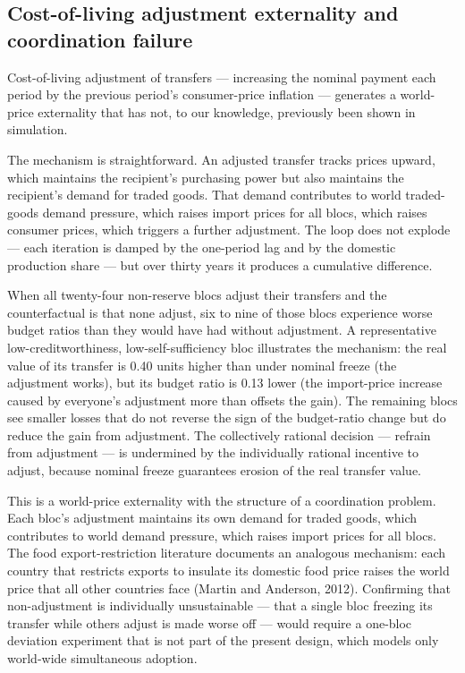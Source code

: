 \documentclass[preprint,review,12pt]{elsarticle}
\begin{document}
\subsection{Cost-of-living adjustment externality and coordination failure}

Cost-of-living adjustment of transfers --- increasing the nominal
payment each period by the previous period's consumer-price inflation
--- generates a world-price externality that has not, to our knowledge,
previously been shown in simulation.

The mechanism is straightforward. An adjusted transfer tracks prices
upward, which maintains the recipient's purchasing power but also
maintains the recipient's demand for traded goods. That demand
contributes to world traded-goods demand pressure, which raises import
prices for all blocs, which raises consumer prices, which triggers a
further adjustment. The loop does not explode --- each iteration is
damped by the one-period lag and by the domestic production share ---
but over thirty years it produces a cumulative difference.

When all twenty-four non-reserve blocs adjust their transfers and the
counterfactual is that none adjust, six to nine of those blocs
experience worse budget ratios than they would have had without
adjustment. A representative low-creditworthiness, low-self-sufficiency
bloc illustrates the mechanism: the real value of its transfer is 0.40
units higher than under nominal freeze (the adjustment works), but its
budget ratio is 0.13 lower (the import-price increase caused by
everyone's adjustment more than offsets the gain). The remaining blocs
see smaller losses that do not reverse the sign of the budget-ratio
change but do reduce the gain from adjustment. The collectively
rational decision --- refrain from adjustment --- is undermined by the
individually rational incentive to adjust, because nominal freeze
guarantees erosion of the real transfer value.

This is a world-price externality with the structure of a coordination
problem. Each bloc's adjustment maintains its own demand for traded
goods, which contributes to world demand pressure, which raises import
prices for all blocs. The food export-restriction literature documents
an analogous mechanism: each country that restricts exports to insulate
its domestic food price raises the world price that all other countries
face (Martin and Anderson, 2012). Confirming that non-adjustment is
individually unsustainable --- that a single bloc freezing its transfer
while others adjust is made worse off --- would require a one-bloc
deviation experiment that is not part of the present design, which
models only world-wide simultaneous adoption.
\end{document}
